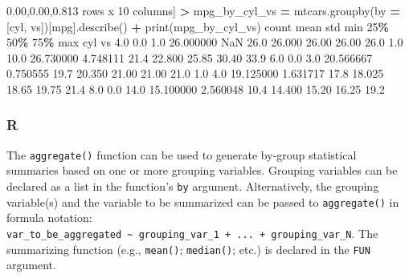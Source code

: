\documentclass[
]{book}
\newenvironment{Shaded}{\begin{snugshade}}{\end{snugshade}}
\newcommand{\BuiltInTok}[1]{#1}
\newcommand{\DecValTok}[1]{\textcolor[rgb]{0.00,0.00,0.81}{#1}}
\newcommand{\FloatTok}[1]{\textcolor[rgb]{0.00,0.00,0.81}{#1}}
\newcommand{\NormalTok}[1]{#1}
\newcommand{\OperatorTok}[1]{\textcolor[rgb]{0.81,0.36,0.00}{\textbf{#1}}}
\newcommand{\StringTok}[1]{\textcolor[rgb]{0.31,0.60,0.02}{#1}}
\begin{document}
\begin{Shaded}
\begin{Highlighting}[]
\NormalTok{[}\DecValTok{3}\NormalTok{ rows x }\DecValTok{10}\NormalTok{ columns]}
\OperatorTok{\textgreater{}}\NormalTok{ mpg\_by\_cyl\_vs }\OperatorTok{=}\NormalTok{ mtcars.groupby(by }\OperatorTok{=}\NormalTok{ [}\StringTok{\textquotesingle{}cyl\textquotesingle{}}\NormalTok{, }\StringTok{\textquotesingle{}vs\textquotesingle{}}\NormalTok{])[}\StringTok{\textquotesingle{}mpg\textquotesingle{}}\NormalTok{].describe()}
\OperatorTok{+} \BuiltInTok{print}\NormalTok{(mpg\_by\_cyl\_vs)}
\NormalTok{         count       mean       std   }\BuiltInTok{min}     \DecValTok{25}\OperatorTok{\%}    \DecValTok{50}\OperatorTok{\%}    \DecValTok{75}\OperatorTok{\%}   \BuiltInTok{max}
\NormalTok{cyl vs                                                               }
\FloatTok{4.0} \FloatTok{0.0}    \FloatTok{1.0}  \FloatTok{26.000000}\NormalTok{       NaN  }\FloatTok{26.0}  \FloatTok{26.000}  \FloatTok{26.00}  \FloatTok{26.00}  \FloatTok{26.0}
    \FloatTok{1.0}   \FloatTok{10.0}  \FloatTok{26.730000}  \FloatTok{4.748111}  \FloatTok{21.4}  \FloatTok{22.800}  \FloatTok{25.85}  \FloatTok{30.40}  \FloatTok{33.9}
\FloatTok{6.0} \FloatTok{0.0}    \FloatTok{3.0}  \FloatTok{20.566667}  \FloatTok{0.750555}  \FloatTok{19.7}  \FloatTok{20.350}  \FloatTok{21.00}  \FloatTok{21.00}  \FloatTok{21.0}
    \FloatTok{1.0}    \FloatTok{4.0}  \FloatTok{19.125000}  \FloatTok{1.631717}  \FloatTok{17.8}  \FloatTok{18.025}  \FloatTok{18.65}  \FloatTok{19.75}  \FloatTok{21.4}
\FloatTok{8.0} \FloatTok{0.0}   \FloatTok{14.0}  \FloatTok{15.100000}  \FloatTok{2.560048}  \FloatTok{10.4}  \FloatTok{14.400}  \FloatTok{15.20}  \FloatTok{16.25}  \FloatTok{19.2}
\end{Highlighting}
\end{Shaded}

\hypertarget{r-39}{%
\subsubsection*{R}\label{r-39}}

The \texttt{aggregate()} function can be used to generate by-group statistical summaries based on one or more grouping variables. Grouping variables can be declared as a list in the function's \texttt{by} argument. Alternatively, the grouping variable(s) and the variable to be summarized can be passed to \texttt{aggregate()} in formula notation: \texttt{var\_to\_be\_aggregated\ \textasciitilde{}\ grouping\_var\_1\ +\ ...\ +\ grouping\_var\_N}. The summarizing function (e.g., \texttt{mean()}; \texttt{median()}; etc.) is declared in the \texttt{FUN} argument.
\end{document}
